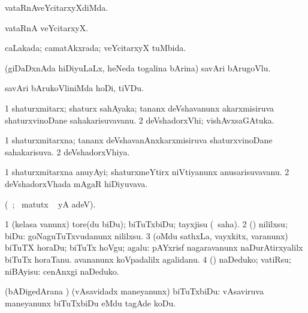 \bentry
{}
\gl{\kirxvi}
\bmng
vataRnAveYcitarxyXdiMda. 
\emng
\eentry

\bentry
{}
\gl{\nA}
\bmng
vataRnA veYcitarxyX. 
\emng
\eentry

\bentry
{}
\gl{\gu}
\bmng
caLakada; camatAkxrada; veYcitarxyX tuMbida. 
\emng
\eentry

\bentry
{}
\gl{\nA}
\bmng
(giDaDxnAda hiDiyuLaLx, heNeda togalina bArina) savAri bArugoVlu. 
\emng
\eentry

\bentry
{}
\gl{\sakirx}
\bmng
savAri bArukoVliniMda hoDi, tiVDu. 
\emng
\eentry

\bentry
{}
\gl{\nA}
\bmng
\bnum
\num{1} shaturxmitarx; shaturx sahAyaka; tananx deVshavanunx akarxmisiruva shaturx\-vinoDane sahakarisuvavanu. 
\num{2} deVshadorxVhi; vishAvxsaGAtuka. 
\enum
\emng
\eentry

\bentry
{}
\gl{\gu}
\bmng
\bnum
\num{1} shaturxmitarxna; tananx deVshavanAnxkarxmisiruva shaturxvinoDane sahakarisuva. 
\num{2} deVshadorxVhiya. 
\enum
\emng
\eentry

\bentry
{}
\gl{\nA}
\expl{}
\bmng
\bnum
\num{1} shaturxmitarxna anuyAyi; shaturxmeYtirx niVtiyanunx anusarisuvavanu. 
\num{2} deVshadorxVhada mAgaR hiDiyuvava. 
\enum
\emng
\eentry

\bentry
{}
\gl{\kirx}
\bmng
(\vakaq\ ; \BU\ matutx \BUkaq\  yA adeV).
\emng

\noindent
\gl{\sakirx}
\bmng
\bnum
\num{1} (kelasa \mo vanunx) tore(du biDu); biTuTxbiDu; tayxjisu (\akirx\ saha). 
\num{2} (\ame) nililxsu; biDu:  goNaguTuTxvudanunx nililxsu. 
\num{3} (oMdu sathxLa, vayxkitx, \mo varanunx) biTuTX horaDu; biTuTx hoVgu; agalu:  pAYxrisf nagaravanunx naDurAtirxyalilx biTuTx horaTanu.  avananunx koVpadalilx agalidanu. 
\num{4} (\AtAmx) naDeduko; vatiRsu; niBAyisu:  cenAnxgi naDeduko. 
\enum
\emng

\noindent
\gl{\akirx}
\bmng
(bADigedArana \vi) (vAsavidadx maneyanunx) biTuTxbiDu:   vAsaviruva maneyanunx biTuTxbiDu eMdu tagAde koDu. 
\emng

